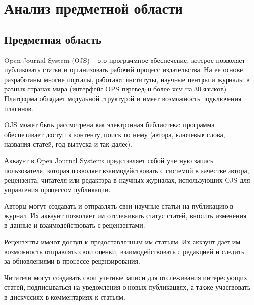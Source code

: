 \newpage
\section{Анализ предметной области}
\label{sec:Background}


\subsection{Предметная область}
\label{subsec:Variants}

Open Journal System (OJS) -- это программное обеспечение, которое позволяет публиковать статьи и организовать рабочий процесс издательства. На ее основе разработаны многие порталы, работают институты, научные центры и журналы в разных странах мира (интерфейс OPS переведeн более чем на 30 языков). Платформа обладает модульной структурой и имеет возможность подключения плагинов. 

OJS может быть рассмотрена как электронная библиотека: программа обеспечивает доступ к контенту, поиск по нему (автора, ключевые слова, названия статей, год выпуска и так далее). 

Аккаунт в Open Journal Systems представляет собой учетную запись пользователя, которая позволяет взаимодействовать с системой в качестве автора, рецензента, читателя или редактора в научных журналах, использующих OJS для управления процессом публикации.

Авторы могут создавать и отправлять свои научные статьи на публикацию в журнал. Их аккаунт позволяет им отслеживать статус статей, вносить изменения в данные и взаимодействовать с рецензентами.

Рецензенты имеют доступ к предоставленным им статьям. Их аккаунт дает им возможность отправлять свои оценки, взаимодействовать с редакцией и следить за обновлениями в процессе рецензирования.

Читатели могут создавать свои учетные записи для отслеживания интересующих статей, подписываться на уведомления о новых публикациях, а также участвовать в дискуссиях в комментариях к статьям.


